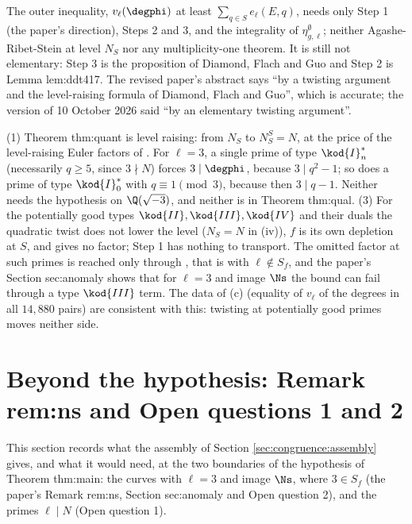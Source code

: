 \begin{remark}\label{rem:congruence:outer-inequality}
The outer inequality, $v_\ell(\degphi)$ at least $\sum_{q\in S}e_\ell(E,q)$, needs only Step 1 (the paper's direction), Steps 2 and 3, and the integrality of $\eta^\emptyset_{g,\ell}$; neither Agashe-Ribet-Stein at level $N_S$ nor
any multiplicity-one theorem. It is still not elementary: Step 3 is the proposition of Diamond, Flach and Guo and Step 2 is Lemma lem:ddt417. The revised paper's abstract says ``by a twisting
argument and the level-raising formula of Diamond, Flach and Guo'', which is accurate; the version of 10 October 2026 said ``by an elementary twisting argument''.
\end{remark}

\begin{remark}\label{rem:congruence:after-quant}
(1) Theorem thm:quant is level raising: from $N_S$ to $N_S^S=N$, at the price of the level-raising Euler factors of . For $\ell=3$, a single prime of type $\kod{I}_n^*$ (necessarily
$q\ge5$, since $3\nmid N$) forces $3\mid\degphi$, because $3\mid q^2-1$; so does a prime of type $\kod{I}_0^*$ with $q\equiv1\pmod3$, because then $3\mid q-1$. Neither needs the hypothesis on $\Q(\sqrt{-3})$, and
neither is in Theorem thm:qual. (3) For the potentially good types $\kod{II},\kod{III},\kod{IV}$ and their duals the quadratic twist does not lower the level ($N_S=N$ in (iv)), $f$ is its own
depletion at $S$, and  gives no factor; Step 1 has nothing to transport. The omitted factor at such primes is reached only through , that is with
$\ell\notin S_f$, and the paper's Section sec:anomaly shows that for $\ell=3$ and image $\Ns$ the bound can fail through a type $\kod{III}$ term. The data of (c) (equality of
$v_\ell$ of the degrees in all $14{,}880$ pairs) are consistent with this: twisting at potentially good primes moves neither side.
\end{remark}

\section[Beyond the hypothesis: rem:ns, Open questions 1, 2]{Beyond the hypothesis: Remark rem:ns and Open questions 1 and 2}\label{sec:congruence:beyond}

This section records what the assembly of Section \ref{sec:congruence:assembly} gives, and what it would need, at the two boundaries of the hypothesis of Theorem thm:main: the
curves with $\ell=3$ and image $\Ns$, where $3\in S_f$ (the paper's Remark rem:ns, Section sec:anomaly and Open question 2), and the primes $\ell\mid N$ (Open question 1).


